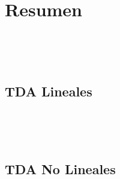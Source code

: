

\appendix

\chapter{Resumen}




\localtableofcontents

\

\



\section{TDA Lineales}












\

\

\section{TDA No Lineales}






